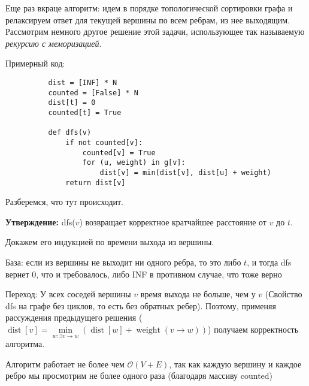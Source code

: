 \documentclass[a4paper,12pt]{article}
\begin{document}
      Еще раз вкраце алгоритм: идем в порядке топологической сортировки графа
      и релаксируем ответ для текущей вершины по всем ребрам, из нее выходящим.
      \\
      
      Рассмотрим немного другое решение этой задачи, использующее так 
      называемую \emph{рекурсию с меморизацией}. 
      
      Примерный код:
      
      \begin{lstlisting}
          dist = [INF] * N
          counted = [False] * N
          dist[t] = 0
          counted[t] = True
          
          def dfs(v)
              if not counted[v]:
                  counted[v] = True
                  for (u, weight) in g[v]:
                      dist[v] = min(dist[v], dist[u] + weight)
              return dist[v]
      \end{lstlisting}
      
      Разберемся, что тут происходит.
      
      \textbf{Утверждение:} dfs($v$) возвращает корректное кратчайшее 
      расстояние от $v$ до $t$.
      
      Докажем его индукцией по времени выхода из вершины.
      
      База: если из вершины не выходит ни одного ребра, то это либо $t$, 
      и тогда dfs вернет $0$, что и требовалось, либо INF в противном случае,
      что тоже верно
      
      Переход: У всех соседей вершины $v$ время выхода не больше, чем у $v$
      (Свойство dfs на графе без циклов, то есть без обратных ребер). Поэтому, 
      применяя рассуждения предыдущего решения
      ($\operatorname{dist}[v] = \min\limits_{w: \exists v \rightarrow w}
      (\operatorname{dist}[w] + \operatorname{weight}(v \rightarrow w))$)
	  получаем корректность алгоритма.
	  
	  Алгоритм работает не более чем $\mathcal{O}(V + E)$, так как каждую вершину и
	  каждое ребро мы просмотрим не более одного раза (благодаря массиву counted)
	  
\end{document}
